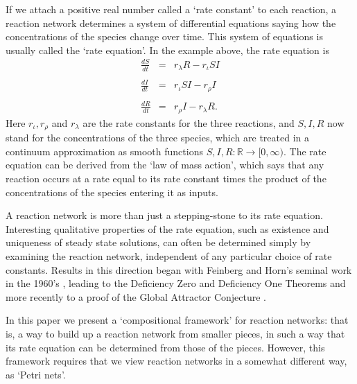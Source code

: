 \documentclass{compositionalityarticle}
\newcommand{\R}{\mathbb{R}}
\newcommand{\maps}{\colon}
\newcommand{\beq}{\begin{equation}}
\newcommand{\eeq}{\end{equation}}
\theoremstyle{plain}
\theoremstyle{remark}
\begin{document}
If we attach a positive real number called a `rate constant' to each reaction, a reaction network determines a system of differential equations saying how the concentrations of the species change over time.    This system of equations is usually called 
the `rate equation'.   In the example above, the rate equation is
\beq
\label{SIRS_rate_equation}
\begin{array}{ccl}
\displaystyle{\frac{d S}{d t}} &=& r_\lambda R - r_\iota S I \\ \\
\displaystyle{\frac{d I}{d t}} &=&  r_\iota S I - r_\rho I \\  \\
\displaystyle{\frac{d R}{d t}} &=& r_\rho I - r_\lambda R .
\end{array}
\eeq
Here $r_\iota, r_\rho$ and $r_\lambda$ are the rate constants for the three
reactions, and $S, I, R$ now stand for the concentrations of the three species, which are treated in a continuum approximation as smooth functions $S, I, R \maps \R \to [0,\infty)$.  The rate equation can be derived from the `law of mass action', which says that any reaction occurs at a rate equal to its rate constant times the product of the concentrations of the species entering it as inputs.    

A reaction network is more than just a stepping-stone to its rate equation.  Interesting qualitative properties of the rate equation, such as existence and uniqueness of steady state solutions, can often be determined simply by examining the reaction network, independent of any particular choice of rate constants.  Results in this direction began with  Feinberg and Horn's seminal work in the 1960's \cite{Feinberg,FeinbergHorn}, leading to the Deficiency Zero and Deficiency One Theorems \cite{Feinberg1995a,Feinberg1995b} and more recently to a proof of the Global Attractor Conjecture \cite{Craciun}.     

In this paper we present a `compositional framework' for reaction networks: that is, a way to build up a reaction network from smaller pieces, in such a way that its rate equation can be determined from those of the pieces.   However, this framework requires that we view reaction networks in a somewhat different way, as `Petri nets'.
\end{document}
